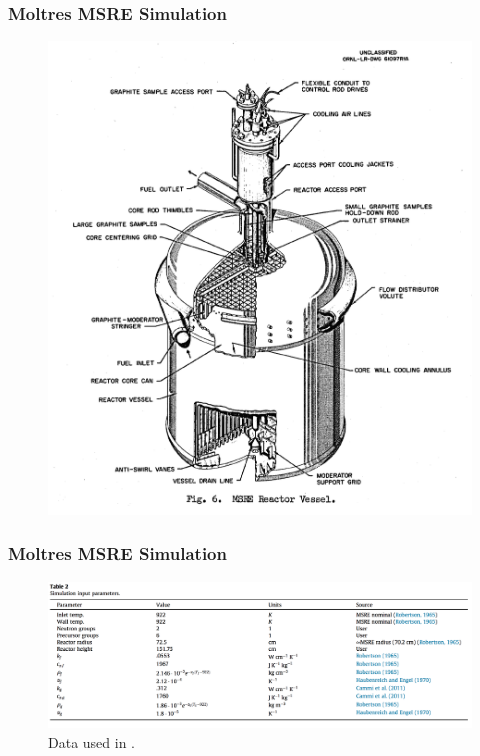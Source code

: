 \begin{frame}
        \frametitle{Moltres MSRE Simulation}
  \begin{figure}
   \vspace{-0.05in}
   \includegraphics[height=0.85\textheight]{./images/msre.png}
    \end{figure}
\end{frame}


\begin{frame}
        \frametitle{Moltres MSRE Simulation}
  \begin{figure}
   \vspace{-0.05in}
   \includegraphics[width=1.2\textwidth]{./images/moltres-input.png}
          \caption{Data used in \cite{lindsay_introduction_2018}.}
    \end{figure}
\end{frame}

